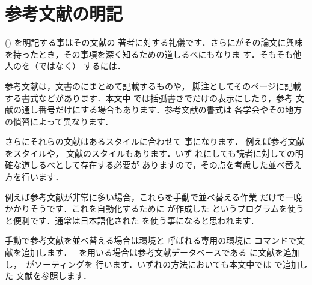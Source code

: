 \section{参考文献の明記}
%

 () を明記する事はその文献の
{著者}に対する礼儀です．さらにがその論文に興味
を持ったとき，その事項を深く知るための道しるべにもなりま
す．そもそも他人のを（ではなく）
するには．

参考文献は，文書のにまとめて記載するものや，
脚注としてそのページに記載する書式などがあります．本文中
では括弧書きでだけの表示にしたり，参考
文献の通し番号だけにする場合もあります．参考文献の書式は
各学会やその地方の慣習によって異なります．

さらにそれらの文献はあるスタイルに合わせて
事になります．
例えば参考文献をスタイルや，
文献のスタイルもあります．いず
れにしても読者に対しての明確な道しるべとして存在する必要が
ありますので，その点を考慮した並べ替え方を行います．

例えば参考文献が非常に多い場合，これらを手動で並べ替える作業
だけで一晩かかりそうです．これを自動化するために
が作成した\Prog[BibTeX]{\BibTeX}%
というプログラムを使うと便利です．通常は日本語化された
\Prog[JBibTeX]{\JBibTeX}を使う事になると思われます．

手動で参考文献を並べ替える場合は環境と
呼ばれる専用の環境に  コマンドで文献を追加します．
%
\JBibTeX\ を用いる場合は{参考文献データベース}である
に文献を追加し，\JBibTeX\ がソーティングを
行います．いずれの方法においても本文中では  で追加した
文献を参照します．


